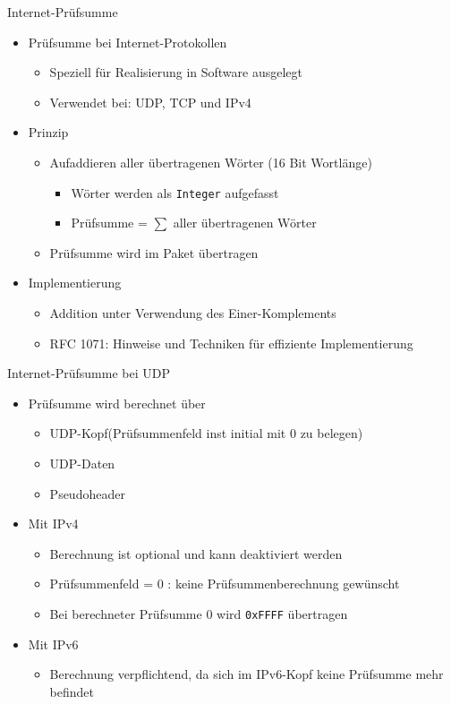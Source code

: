     Internet-Prüfsumme
    \begin{itemize}
      \item Prüfsumme bei Internet-Protokollen
        \begin{itemize}
          \item Speziell für Realisierung in Software ausgelegt
          \item Verwendet bei: UDP, TCP und IPv4
        \end{itemize}
      \item Prinzip
        \begin{itemize}
          \item Aufaddieren aller übertragenen Wörter (16 Bit Wortlänge)
            \begin{itemize}
              \item Wörter werden als \verb!Integer! aufgefasst
              \item Prüfsumme = $\sum$ aller übertragenen Wörter
            \end{itemize}
          \item Prüfsumme wird im Paket übertragen
        \end{itemize}
      \item Implementierung
        \begin{itemize}
          \item Addition unter Verwendung des Einer-Komplements
          \item RFC 1071: Hinweise und Techniken für effiziente Implementierung
        \end{itemize}
    \end{itemize}
    Internet-Prüfsumme bei UDP
    \begin{itemize}
      \item Prüfsumme wird berechnet über
        \begin{itemize}
          \item UDP-Kopf(Prüfsummenfeld inst initial mit 0 zu belegen)
          \item UDP-Daten
          \item Pseudoheader    
        \end{itemize}
      \item Mit IPv4
        \begin{itemize}
          \item Berechnung ist optional und kann deaktiviert werden
          \item Prüfsummenfeld = 0 : keine Prüfsummenberechnung gewünscht
          \item Bei berechneter Prüfsumme 0 wird \verb!0xFFFF! übertragen
        \end{itemize}
      \item Mit IPv6
        \begin{itemize}
          \item Berechnung verpflichtend, da sich im IPv6-Kopf keine Prüfsumme mehr befindet
        \end{itemize}
    \end{itemize}
